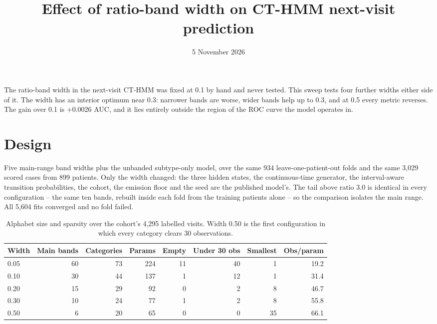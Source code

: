 \documentclass[11pt]{article}
\title{\textbf{Effect of ratio-band width on CT-HMM next-visit prediction}}
\date{5 November 2026}
\begin{document}
\maketitle
\thispagestyle{empty}

The ratio-band width in the next-visit CT-HMM was fixed at 0.1 by hand and never tested. This sweep tests four further widths either side of it. The width has an interior optimum near 0.3: narrower bands are worse, wider bands help up to 0.3, and at 0.5 every metric reverses. The gain over 0.1 is $+0.0026$ AUC, and it lies entirely outside the region of the ROC curve the model operates in.

\section*{Design}

Five main-range band widths plus the unbanded subtype-only model, over the same 934 leave-one-patient-out folds and the same 3,029 scored cases from 899 patients. Only the width changed: the three hidden states, the continuous-time generator, the interval-aware transition probabilities, the cohort, the emission floor and the seed are the published model's. The tail above ratio 3.0 is identical in every configuration -- the same ten bands, rebuilt inside each fold from the training patients alone -- so the comparison isolates the main range. All 5,604 fits converged and no fold failed.

\begin{table}[htbp]
\centering\small
\caption{Alphabet size and sparsity over the cohort's 4,295 labelled visits. Width 0.50 is the first configuration in which every category clears 30 observations.}\label{tab:complexity}
\begin{tabular}{lrrrrrrr}
\toprule
  \textbf{Width} & \textbf{Main bands} & \textbf{Categories} & \textbf{Params} & \textbf{Empty} & \textbf{Under 30 obs} & \textbf{Smallest} & \textbf{Obs/param} \\
\midrule
  0.05 & 60 & 73 & 224 & 11 & 40 & 1 & 19.2 \\
  0.10 & 30 & 44 & 137 & 1 & 12 & 1 & 31.4 \\
  0.20 & 15 & 29 & 92 & 0 & 2 & 8 & 46.7 \\
  0.30 & 10 & 24 & 77 & 1 & 2 & 8 & 55.8 \\
  0.50 & 6 & 20 & 65 & 0 & 0 & 35 & 66.1 \\
\bottomrule
\end{tabular}
\end{table}
\end{document}
